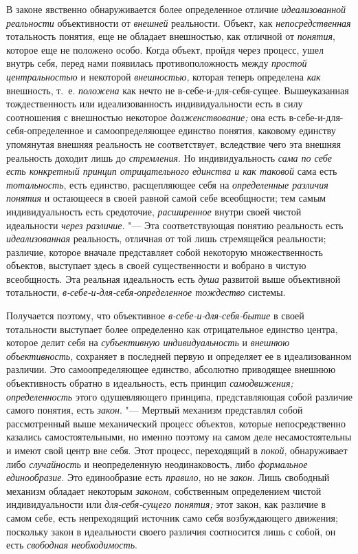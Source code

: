 В законе явственно обнаруживается более определенное отличие
{\em идеализованной реальности}
объективности от
{\em внешней} реальности.
Объект, как {\em непосредственная}
тотальность понятия, еще не обладает внешностью, как отличной
от {\em понятия}, которое
еще не положено особо. Когда объект, пройдя через процесс, ушел внутрь
себя, перед нами появилась противоположность между
{\em простой центральностью}
и некоторой
{\em внешностью}, которая
теперь определена {\em как}
внешность, т.~е.
{\em положена} как нечто
не в-себе-и-для-себя-сущее. Вышеуказанная тождественность или
идеализованность индивидуальности есть в силу соотношения с внешностью
некоторое {\em долженствование;}
она есть в-себе-и-для-себя-определенное и самоопределяющее
единство понятия, каковому единству упомянутая внешняя реальность не
соответствует, вследствие чего эта внешняя реальность доходит лишь до
{\em стремления}. Но
индивидуальность {\em сама по себе есть
конкретный принцип отрицательного единства и как таковой}
сама есть
{\em тотальность}, есть
единство, расщепляющее себя на
{\em определенные различия понятия}
и остающееся в своей равной самой себе всеобщности; тем самым
индивидуальность есть средоточие,
{\em расширенное} внутри
своей чистой идеальности {\em через
различие}. "--- Эта соответствующая понятию реальность есть
{\em идеализованная}
реальность, отличная от той лишь стремящейся реальности;
различие, которое вначале представляет собой некоторую множественность
объектов, выступает здесь в своей существенности и вобрано в чистую
всеобщность. Эта реальная идеальность есть
{\em душа} развитой выше
объективной тотальности,
{\em в-себе-и-для-себя-определенное
тождество} системы.

Получается поэтому, что объективное
{\em в-себе-и-для-себя-бытие}
в своей тотальности выступает более определенно как
отрицательное единство центра, которое делит себя на
{\em субъективную индивидуальность}
и {\em внешнюю
объективность}, сохраняет в последней первую и определяет ее
в идеализованном различии. Это самоопределяющее единство, абсолютно
приводящее внешнюю объективность обратно в идеальность, есть принцип
{\em самодвижения;}
{\em определенность} этого
одушевляющего принципа, представляющая собой различие самого понятия, есть
{\em закон}. "--- Мертвый
механизм представлял собой рассмотренный выше механический
процесс объектов, которые непосредственно казались самостоятельными, но
именно поэтому на самом деле несамостоятельны и имеют свой центр вне себя.
Этот процесс, переходящий в
{\em покой}, обнаруживает
либо {\em случайность} и
неопределенную неодинаковость, либо
{\em формальное единообразие}.
Это единообразие есть
{\em правило}, но не
{\em закон}. Лишь
свободный механизм обладает некоторым
{\em законом},
собственным определением чистой индивидуальности или
{\em для-себя-сущего понятия;}
этот закон, как различие в самом себе, есть непреходящий
источник само себя возбуждающего движения; поскольку закон в идеальности
своего различия соотносится лишь с собой, он есть
{\em свободная необходимость}.

